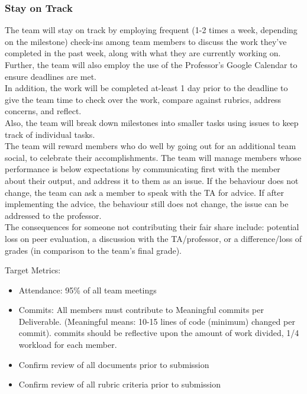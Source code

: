 \documentclass{article}
\begin{document}
\subsubsection*{Stay on Track}

\indent The team will stay on track by employing frequent (1-2 times a week, depending on the milestone)
check-ins among team members to discuss the work they've completed in the past week, along with
what they are currently working on.\\
\indent Further, the team will also employ the use of the Professor's Google Calendar to ensure deadlines are met.\\
\indent In addition, the work will be completed at-least 1 day prior to the deadline to give the team time to check over
the work, compare against rubrics, address concerns, and reflect.\\
\indent Also, the team will break down milestones into smaller tasks using issues to keep track of individual tasks.\\

\indent The team will reward members who do well by going out for an additional team social, to celebrate their accomplishments.
The team will manage members whose performance is below expectations by communicating first with the member
about their output, and address it to them as an issue. If the behaviour does not change, the team can ask a member
to speak with the TA for advice. If after implementing the advice, the behaviour still does not change, the issue can
be addressed to the professor.\\
\indent The consequences for someone not contributing their fair share include: potential loss on peer evaluation, a discussion
with the TA/professor, or a difference/loss of grades (in comparison to the team's final grade).

Target Metrics:
\begin{itemize}
  \item Attendance: 95\% of all team meetings
  \item Commits: All members must contribute to Meaningful commits per Deliverable. (Meaningful means: 10-15 lines of code (minimum) changed per commit). 
  commits should be reflective upon the amount of work divided, 1/4 workload for each member.
  \item Confirm review of all documents prior to submission
  \item Confirm review of all rubric criteria prior to submission
\end{itemize}
\end{document}
